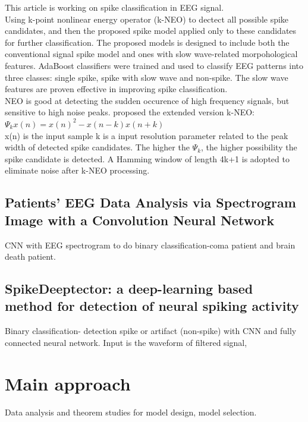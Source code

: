 \documentclass[8pt,a4paper]{article}
\begin{document}
 This article is working on spike classification in EEG signal.\\

 Using k-point nonlinear energy operator (k-NEO) to dectect all possible spike candidates, 
 and then the proposed  spike model applied only to these candidates for further classification. 
 The proposed models is designed to include both the conventional signal spike model and ones with slow wave-related morpohological features. 
 AdaBoost classifiers were trained and used to classify EEG patterns into three classes: 
 single spike, spike with slow wave and non-spike. 
 The slow wave features are proven effective in improving spike classification.\\

 NEO is good at detecting the sudden occurence of high frequency signals, but sensitive to high noise peaks.
 \cite{Choi2002} proposed the extended version k-NEO:\\
 $\Psi_{k} {x(n)}=x(n)^2-x(n-k)x(n+k)$
\\
x(n) is the input sample
k is a input resolution parameter related to the peak width of detected spike candidates.
The higher the $\Psi_{k}$, the higher possibility the spike candidate is detected.
A Hamming window of length 4k+1 is adopted to eliminate noise after k-NEO processing.\cite{Liu2014}


\subsection*{Patients’ EEG Data Analysis via Spectrogram Image with a Convolution Neural Network} 

CNN with EEG spectrogram to do binary classification-coma patient and brain death patient.\cite{Yuan2018}

\subsection*{SpikeDeeptector: a deep-learning based method for detection of neural spiking activity} 

Binary classification- detection spike or artifact (non-spike) with CNN and fully connected neural network.
Input is the waveform of filtered signal, \cite{Saif_ur_Rehman_2019}

\section*{Main approach}
Data analysis and theorem studies for model design, model selection.

 \label{sec:references} 
\newpage
\end{document}
